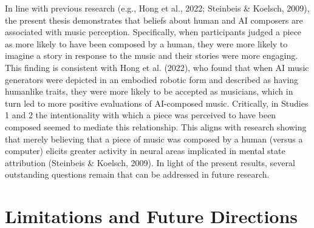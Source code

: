 \documentclass[12pt,twoside]{reedthesis}
\begin{document}
In line with previous research (e.g., Hong et al., 2022; Steinbeis \& Koelsch, 2009), the present thesis demonstrates that beliefs about human and AI composers are associated with music perception. Specifically, when participants judged a piece as more likely to have been composed by a human, they were more likely to imagine a story in response to the music and their stories were more engaging. This finding is consistent with Hong et al. (2022), who found that when AI music generators were depicted in an embodied robotic form and described as having humanlike traits, they were more likely to be accepted as musicians, which in turn led to more positive evaluations of AI-composed music. Critically, in Studies 1 and 2 the intentionality with which a piece was perceived to have been composed seemed to mediate this relationship. This aligns with research showing that merely believing that a piece of music was composed by a human (versus a computer) elicits greater activity in neural areas implicated in mental state attribution (Steinbeis \& Koelsch, 2009). In light of the present results, several outstanding questions remain that can be addressed in future research. 



\section*{Limitations and Future Directions}
\end{document}
